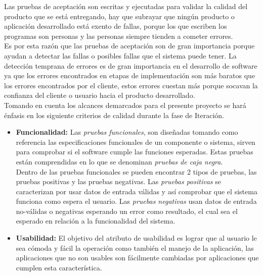               Las pruebas de aceptación son escritas y ejecutadas para validar la calidad del producto que se está entregando, hay que subrayar que ningún producto o aplicación desarrollado está exento de fallas, porque los que escriben los programas son personas y las personas siempre tienden a cometer errores. \\

              Es por esta razón que las pruebas de aceptación son de gran importancia porque ayudan a detectar las fallas o posibles fallas que el sistema puede tener. La detección temprana de errores es de gran importancia en el desarrollo de software ya que los errores encontrados en etapas de implementación son más baratos que los errores encontrados por el cliente, estos errores cuestan más porque socavan la confianza  del cliente o usuario hacia el producto desarrollado. \\

              Tomando en cuenta los alcances demarcados para el presente proyecto se hará énfasis en los siguiente criterios de calidad durante la fase de Iteración.




              \begin{itemize}
                \item \textbf{Funcionalidad:} Las \emph{pruebas funcionales}, son diseñadas tomando como referencia las especificaciones funcionales de un componente o sistema, sirven para comprobar si el software cumple las funciones esperadas. Estas pruebas están comprendidas en lo que se denominan \emph{pruebas de caja negra}. \cite{glosarioTesting} \\

                Dentro de las pruebas funcionales se pueden encontrar 2 tipos de pruebas, las pruebas positivas y  las pruebas negativas.  Las \emph{pruebas positivas} se caracterizan por usar datos de entrada válidas y así comprobar que el sistema funciona como espera el usuario. Las \emph{pruebas negativas} usan datos de entrada no-válidas o negativas esperando un error como resultado, el cual sea el esperado en relación a la funcionalidad del sistema. \cite[p. 24]{casosPruebaUmss}


                \item \textbf{Usabilidad:} El objetivo del atributo de usabilidad es lograr
              que al usuario le sea cómoda y fácil la operación como también el manejo de la aplicación, las aplicaciones que no son usables son fácilmente cambiadas por aplicaciones que cumplen esta característica.  \cite[p. 27]{qaWeb}


              \end{itemize}




